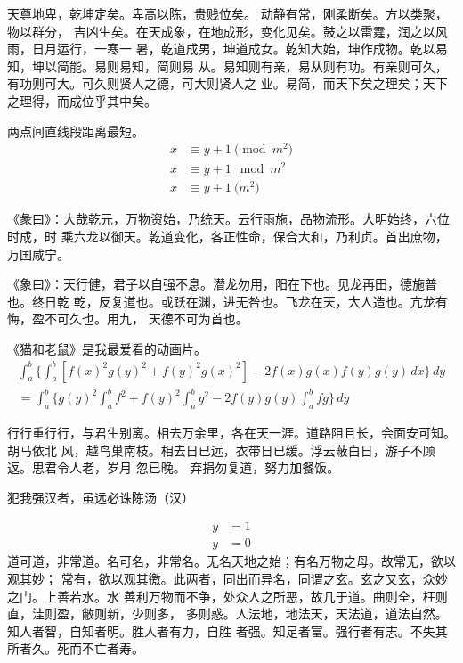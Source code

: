 天尊地卑，乾坤定矣。卑高以陈，贵贱位矣。 动静有常，刚柔断矣。方以类聚，物以群分，
吉凶生矣。在天成象，在地成形，变化见矣。鼓之以雷霆，润之以风雨，日月运行，一寒一
暑，乾道成男，坤道成女。乾知大始，坤作成物。乾以易知，坤以简能。易则易知，简则易
从。易知则有亲，易从则有功。有亲则可久，有功则可大。可久则贤人之德，可大则贤人之
业。易简，而天下矣之理矣；天下之理得，而成位乎其中矣。

\begin{axiom}
两点间直线段距离最短。
\begin{align}
x&\equiv y+1\pmod{m^2}\\
x&\equiv y+1\mod{m^2}\\
x&\equiv y+1\pod{m^2}
\end{align}
\end{axiom}

《彖曰》：大哉乾元，万物资始，乃统天。云行雨施，品物流形。大明始终，六位时成，时
乘六龙以御天。乾道变化，各正性命，保合大和，乃利贞。首出庶物，万国咸宁。

《象曰》：天行健，君子以自强不息。潜龙勿用，阳在下也。见龙再田，德施普也。终日乾
乾，反复道也。或跃在渊，进无咎也。飞龙在天，大人造也。亢龙有悔，盈不可久也。用九，
天德不可为首也。 　　

\begin{lemma}
《猫和老鼠》是我最爱看的动画片。
\begin{multline*}%
\int_a^b\biggl\{\int_a^b[f(x)^2g(y)^2+f(y)^2g(x)^2]
 -2f(x)g(x)f(y)g(y)\,dx\biggr\}\,dy \\
 =\int_a^b\biggl\{g(y)^2\int_a^bf^2+f(y)^2
  \int_a^b g^2-2f(y)g(y)\int_a^b fg\biggr\}\,dy
\end{multline*}
\end{lemma}

行行重行行，与君生别离。相去万余里，各在天一涯。道路阻且长，会面安可知。胡马依北
风，越鸟巢南枝。相去日已远，衣带日已缓。浮云蔽白日，游子不顾返。思君令人老，岁月
忽已晚。  弃捐勿复道，努力加餐饭。

\begin{theorem}\label{the:theorem1}
犯我强汉者，虽远必诛\hfill \pozhehao 陈汤（汉）
\end{theorem}
\begin{subequations}
\begin{align}
y & = 1 \\
y & = 0
\end{align}
\end{subequations}
道可道，非常道。名可名，非常名。无名天地之始；有名万物之母。故常无，欲以观其妙；
常有，欲以观其徼。此两者，同出而异名，同谓之玄。玄之又玄，众妙之门。上善若水。水
善利万物而不争，处众人之所恶，故几于道。曲则全，枉则直，洼则盈，敝则新，少则多，
多则惑。人法地，地法天，天法道，道法自然。知人者智，自知者明。胜人者有力，自胜
者强。知足者富。强行者有志。不失其所者久。死而不亡者寿。

